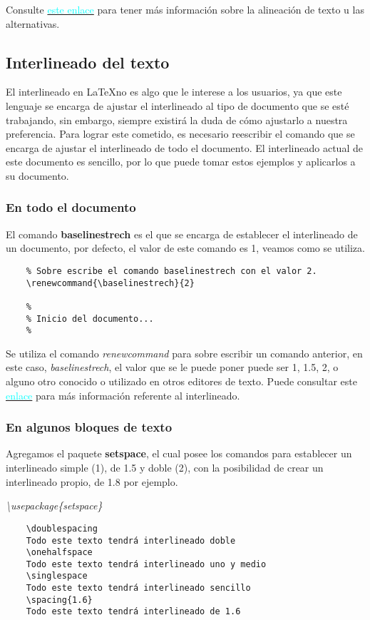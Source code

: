 Consulte \href{https://www.overleaf.com/learn/latex/Paragraphs_and_new_lines#Paragraph_alignment}{\textcolor{cyan}{este enlace}} para tener más información sobre la alineación de texto u las alternativas.


\subsection{Interlineado del texto}

El interlineado en \LaTeX no es algo que le interese a los usuarios, ya que este lenguaje se encarga de ajustar el interlineado al tipo de documento que se esté trabajando, sin embargo, siempre existirá la duda de cómo ajustarlo a nuestra preferencia. Para lograr este cometido, es necesario reescribir el comando que se encarga de ajustar el interlineado de todo el documento. El interlineado actual de este documento es sencillo, por lo que puede tomar estos ejemplos y aplicarlos a su documento.


\subsubsection{En todo el documento}

El comando \textbf{baselinestrech} es el que se encarga de establecer el interlineado de un documento, por defecto, el valor de este comando es 1, veamos como se utiliza.
\begin{lstlisting}
    % Sobre escribe el comando baselinestrech con el valor 2.
    \renewcommand{\baselinestrech}{2}

    % 
    % Inicio del documento...
    % 
\end{lstlisting}

Se utiliza el comando \textit{renewcommand} para sobre escribir un comando anterior, en este caso, \textit{baselinestrech}, el valor que se le puede poner puede ser 1, 1.5, 2, o alguno otro conocido o utilizado en otros editores de texto. Puede consultar este \href{http://elclubdelautodidacta.es/wp/2012/06/latex-modificando-el-espacio-de-interlineado/}{\textcolor{cyan}{enlace}} para más información referente al interlineado.


\subsubsection{En algunos bloques de texto}

Agregamos el paquete \textbf{setspace}, el cual posee los comandos para establecer un interlineado simple (1), de 1.5 y doble (2), con la posibilidad de crear un interlineado propio, de 1.8 por ejemplo.
\begin{center}
    \textit{\textbackslash{usepackage\{setspace\}}}
\end{center}
\begin{lstlisting}
    \doublespacing
    Todo este texto tendrá interlineado doble
    \onehalfspace
    Todo este texto tendrá interlineado uno y medio
    \singlespace
    Todo este texto tendrá interlineado sencillo
    \spacing{1.6}
    Todo este texto tendrá interlineado de 1.6
\end{lstlisting}


